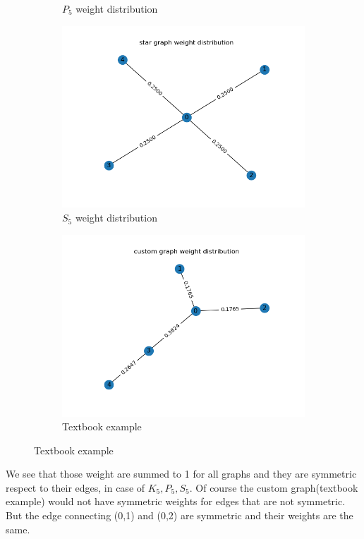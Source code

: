 \documentclass{article}
\begin{document}
\begin{problem}
\begin{figure}[!h]
\begin{subfigure}{0.45\textwidth}
            \caption{$P_5$ weight distribution}
        \end{subfigure}
        \begin{subfigure}{0.45\textwidth}
            \includegraphics[width=\textwidth]{./img/p5_star.png}
            \caption{$S_5$ weight distribution}
        \end{subfigure}
        \begin{subfigure}{0.45\textwidth}
            \includegraphics[width=\textwidth]{./img/p5_textbook.png}
            \caption{Textbook example }
        \end{subfigure}
    \end{figure}

    We see that those weight are summed to 1 for all graphs and they are symmetric respect to their edges, in case of $K_5, P_5, S_5$. Of course the custom graph(textbook example) would not have symmetric weights for edges that are not symmetric. But the edge connecting (0,1) and (0,2) are symmetric and their weights are the same.
\end{problem}
\newpage
\end{document}
